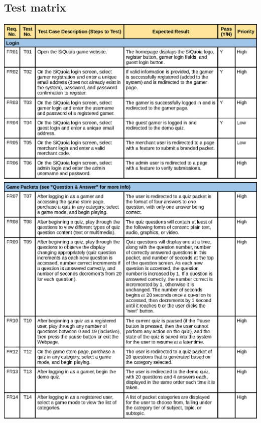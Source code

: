\documentclass[12pt]{article}
\begin{document}
\subsection{Test matrix}
\begin{center}
\includegraphics[width=\textwidth]{tests0}
\newpage
\includegraphics[width=\textwidth]{tests1}
\newpage

\end{center}
\end{document}
